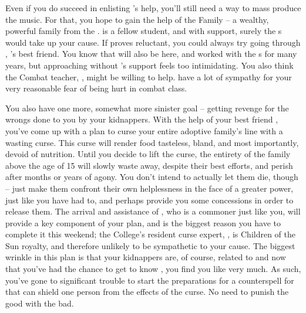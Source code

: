 \documentclass[char]{GL2020}
\begin{document}
Even if you do succeed in enlisting \cMusic{}'s help, you'll still need a way to mass produce the music. For that, you hope to gain the help of the \cHeir{\formal} Family – a wealthy, powerful family from the \pTech{}. \cHeir{\full} is a fellow student, and with \cHeir{\their} support, surely the \cHeir{\formal}s would take up your cause. If \cHeir{} proves reluctant, you could always try going through \cAmbition{}, \cHeir{}'s best friend. You know that \cDiplomat{\full} will also be here, and \cDiplomat{\they} \cDiplomat{\have} worked with the \cHeir{\formal}s for many years, but approaching \cDiplomat{\them} without \cHeir{}'s support feels too intimidating. You also think the Combat teacher, \cInterpol{\full}, might be willing to help. \cInterpol{\They} have a lot of sympathy for your very reasonable fear of being hurt in combat class.

You also have one more, somewhat more sinister goal -- getting revenge for the wrongs done to you by your kidnappers. With the help of your best friend \cLibAssist{\full}, you've come up with a plan to curse your entire adoptive family's line with a wasting curse. This curse will render food tasteless, bland, and most importantly, devoid of nutrition. Until you decide to lift the curse, the entirety of the \cAdopted{\formal} family above the age of 15 will slowly waste away, despite their best efforts, and perish after months or years of agony. You don't intend to actually let them die, though -- just make them confront their own helplessness in the face of a greater power, just like you have had to, and perhaps provide you some concessions in order to release them. The arrival and assistance of \cCurse{}, who is a commoner just like you, will provide a key component of your plan, and is the biggest reason you have to complete it this weekend; the College's resident curse expert, \cPrince{\Heir} \cPrince{}, is Children of the Sun royalty, and therefore unlikely to be sympathetic to your cause. The biggest wrinkle in this plan is that your kidnappers are, of course, related to \cMusic{} and now that you've had the chance to get to know \cMusic{\them}, you find you like \cMusic{\them} very much. As such, you've gone to significant trouble to start the preparations for a counterspell for \cMusic{\them} that can shield one person from the effects of the curse. No need to punish the good with the bad.
\end{document}
